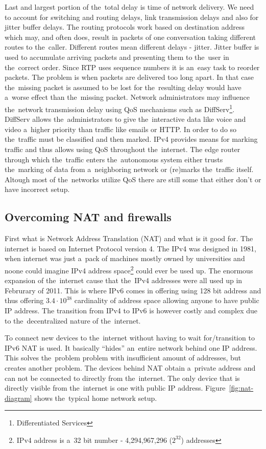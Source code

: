 Last and largest portion of the~total delay is time of network delivery. We need to account for switching and routing delays, link transmission delays and also for jitter buffer delays. The routing protocols work based on destination address which may, and often does, result in packets of one conversation taking different routes to the~caller. Different routes mean different delays - jitter. Jitter buffer is used to accumulate arriving packets and presenting them to the~user in the~correct order. Since RTP uses sequence numbers it is an~easy task to reorder packets. The problem is when packets are delivered too long apart. In that case the~missing packet is assumed to be lost for the~resulting delay would have a~worse effect than the~missing packet. Network administrators may influence the~network transmission delay using QoS mechanisms such as DiffServ\footnote{Differentiated Services}. DiffServ allows the~administrators to give the~interactive data like voice and video a~higher priority than traffic like emails or HTTP. In order to do so the~traffic must be classified and then marked. IPv4 provides means for marking traffic and thus allows using QoS throughout the~internet. The edge router through which the~traffic enters the~autonomous system either trusts the~marking of data from a~neighboring network or (re)marks the~traffic itself. Altough most of the~networks utilize QoS there are still some that either don't or have incorrect setup.  

\subsection*{Overcoming NAT and firewalls}
First what is Network Address Translation (NAT) and what is it good for. The internet is based on Internet Protocol version 4. The IPv4 was designed in 1981, when internet was just a~pack of machines mostly owned by universities and noone could imagine IPv4 address space\footnote{IPv4 address is a~32 bit number - 4,294,967,296 ($2^{32}$) addresses} could ever be used up. The enormous expansion of the~internet cause that the~IPv4 addresses were all used up in Februrary of 2011\cite{ianaAddressSpaceReport}. This is where IPv6 comes in offering using 128 bit address and thus offering $3.4\cdot10^{38}$ cardinality of address space allowing anyone to have public IP address. The transition from IPv4 to IPv6 is however costly and complex due to the~decentralized nature of the~internet.  

To connect new devices to the~internet without having to wait for/transition to IPv6 NAT is used. It basically ``hides'' an~entire network behind one IP address. This solves the~problem problem with insufficient amount of addresses, but creates another problem. The devices behind NAT obtain a~private address and can not be connected to directly from the~internet. The only device that is directly visible from the~internet is one with public IP address. Figure~\ref{fig:nat-diagram} shows the~typical home network setup. 

